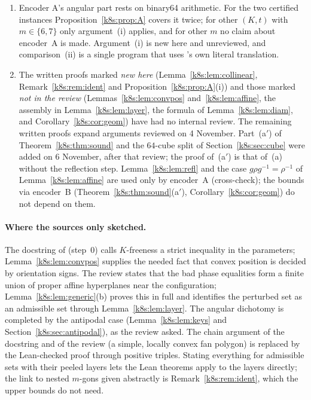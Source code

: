 \begin{enumerate}[label=(G\arabic*)]
this is evidence that also trusts the Lean compiler and runtime); that its \texttt{s VERIFIED UNSAT} means unsatisfiability of the
formula its own parser reads (trusted: cake\_lpr's verified HOL4/CakeML checker) and that this parser reads the files
as the package's parser does (not verified; tested on samples only, ); the step from an admissible set to an ; and the assembly of the steps into one theorem. The
results of this section other than the cited Lean theorems are written proofs only, and the sixfold bound is not
formally verified end to end.
\item Encoder A's angular part rests on binary64 arithmetic. For the two certified instances
Proposition~\ref{k8s:prop:A} covers it twice; for other $(K,t)$ with $m\in\{6,7\}$ only argument~(i) applies, and for
other $m$ no claim about encoder~A is made. Argument~(i) is new here and unreviewed, and comparison~(ii) is a single
program that uses 's own literal translation.
\item The written proofs marked \emph{new here} (Lemma~\ref{k8s:lem:collinear}, Remark~\ref{k8s:rem:ident} and
Proposition~\ref{k8s:prop:A}(i)) and those marked \emph{not in the review} (Lemmas~\ref{k8s:lem:convpos}
and~\ref{k8s:lem:affine}, the assembly in Lemma~\ref{k8s:lem:layer}, the formula of Lemma~\ref{k8s:lem:diam}, and
Corollary~\ref{k8s:cor:geom}) have had no internal review. The remaining written proofs expand arguments reviewed on
4 November. Part~(a$'$) of Theorem~\ref{k8s:thm:sound} and the $64$-cube split of Section~\ref{k8s:sec:cube} were added
on 6 November, after that review; the proof of~(a$'$) is that of~(a) without the reflection step.
Lemma~\ref{k8s:lem:refl} and the case $g\rho g^{-1}=\rho^{-1}$ of Lemma~\ref{k8s:lem:affine} are used only by
encoder~A (cross-check); the bounds via encoder~B (Theorem~\ref{k8s:thm:sound}(a$'$), Corollary~\ref{k8s:cor:geom})
do not depend on them.
\end{enumerate}

\paragraph{Where the sources only sketched.} The docstring of  (step~0) calls $K$-freeness a strict
inequality in the parameters; Lemma~\ref{k8s:lem:convpos} supplies the needed fact that convex position is decided by
orientation signs. The review states that the bad phase equalities form a finite union of proper affine hyperplanes
near the configuration; Lemma~\ref{k8s:lem:generic}(b) proves this in full and identifies the perturbed set as an
admissible set through Lemma~\ref{k8s:lem:layer}. The angular dichotomy is completed by the antipodal case
(Lemma~\ref{k8s:lem:keys} and Section~\ref{k8s:sec:antipodal}), as the review asked. The chain argument of the docstring
and of the review (a simple, locally convex fan polygon) is replaced by the Lean-checked proof through positive
triples. Stating everything for admissible sets with their peeled layers lets the Lean theorems apply to the layers
directly; the link to nested $m$-gons given abstractly is Remark~\ref{k8s:rem:ident}, which the upper bounds do not
need.
